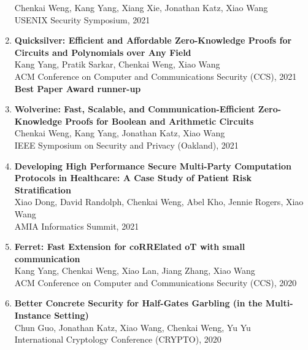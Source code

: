 \documentclass[letterpaper,11pt]{article}
\newcommand{\resumeItemListStart}{\begin{itemize}}
\begin{document}
\begin{enumerate}[leftmargin=0.20in]
		{\small Chenkai Weng, Kang Yang, Xiang Xie, Jonathan Katz, Xiao Wang \vspace{-2pt}} \\
		{\small USENIX Security Symposium, 2021}
  \item
	  {\textbf{\small Quicksilver: Efficient and Affordable Zero-Knowledge Proofs for Circuits and Polynomials over Any Field}} \\
		{\small Kang Yang, Pratik Sarkar, Chenkai Weng, Xiao Wang \vspace{-2pt}} \\
		{\small ACM Conference on Computer and Communications Security (CCS), 2021} \\
    {\small \textbf{Best Paper Award runner-up}}
  \item
    {\textbf{\small Wolverine: Fast, Scalable, and Communication-Efficient Zero-Knowledge Proofs for Boolean and Arithmetic Circuits}} \\
		{\small Chenkai Weng, Kang Yang, Jonathan Katz, Xiao Wang \vspace{-2pt}} \\
		{\small IEEE Symposium on Security and Privacy (Oakland), 2021}
  \item
          {\textbf{\small Developing High Performance Secure Multi-Party Computation Protocols in Healthcare: A Case Study of Patient Risk Stratification}} \\
		{\small Xiao Dong, David Randolph, Chenkai Weng, Abel Kho, Jennie Rogers, Xiao Wang \vspace{-2pt}} \\
		{\small AMIA Informatics Summit, 2021}
  \item
          {\textbf{\small Ferret: Fast Extension for coRRElated oT with small communication}} \\
		{\small Kang Yang, Chenkai Weng, Xiao Lan, Jiang Zhang, Xiao Wang\vspace{-2pt}} \\
		{\small ACM Conference on Computer and Communications Security (CCS), 2020}
  \item
          {\textbf{\small Better Concrete Security for Half-Gates Garbling (in the Multi-Instance Setting)}} \\
		{\small Chun Guo, Jonathan Katz, Xiao Wang, Chenkai Weng, Yu Yu\vspace{-2pt}} \\ 
		{\small International Cryptology Conference (CRYPTO), 2020}
\end{enumerate}
\end{document}
